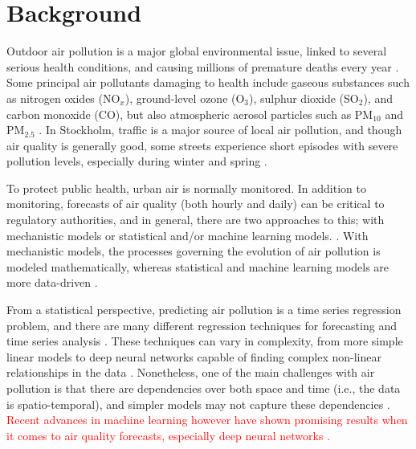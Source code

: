 
\section{Background}

Outdoor air pollution is a major global environmental issue, linked to several serious health conditions, and causing millions of premature deaths every year \cite{who2016}. Some principal air pollutants damaging to health include gaseous substances such as nitrogen oxides (NO$_x$), ground-level ozone (O$_3$), sulphur dioxide (SO$_2$), and carbon monoxide (CO), but also atmospheric aerosol particles such as PM$_{10}$ and PM$_{2.5}$ \cite{VanLoon2010}. In Stockholm, traffic is a major source of local air pollution, and though air quality is generally good, some streets experience short episodes with severe pollution levels, especially during winter and spring \cite{slbanalys}. %

To protect public health, urban air is normally monitored. In addition to monitoring, forecasts of air quality (both hourly and daily) can be critical to regulatory authorities, and in general, there are two approaches to this; with mechanistic models or statistical and/or machine learning models. \cite{ElHarbawi2013, Liao2020, atmos7020015}. %
With mechanistic models, the processes governing the evolution of air pollution is modeled mathematically, whereas statistical and machine learning models are more data-driven \cite{atmos7020015}. 

From a statistical perspective, predicting air pollution is a time series regression problem, and there are many different regression techniques for forecasting and time series analysis \cite{atmos7020015}. These techniques can vary in complexity, from more simple linear models to deep neural networks capable of finding complex non-linear relationships in the data \cite{atmos7020015, LeCun2015}. Nonetheless, one of the main challenges with air pollution is that there are dependencies over both space and time (i.e., the data is spatio-temporal), and simpler models may not capture these dependencies \cite{Liao2020}. \textcolor{red}{Recent advances in machine learning however have shown promising results when it comes to air quality forecasts, especially deep neural networks \cite{Liao2020, atmos7020015}.} 

